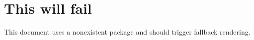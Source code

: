 \documentclass{article}
\begin{document}
\section{This will fail}
This document uses a nonexistent package and should trigger fallback rendering.
\end{document}
